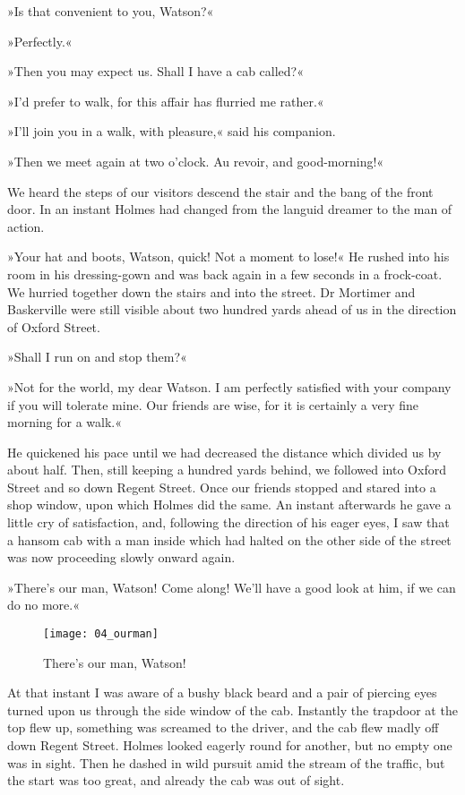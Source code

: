 »Is that convenient to you, Watson?«

»Perfectly.«

»Then you may expect us. Shall I have a cab called?«

»I'd prefer to walk, for this affair has flurried me rather.«

»I'll join you in a walk, with pleasure,« said his companion.

»Then we meet again at two o'clock. Au revoir, and good-morning!«

We heard the steps of our visitors descend the stair and the bang of the front door. In an instant Holmes had changed from the languid dreamer to the man of action.

»Your hat and boots, Watson, quick! Not a moment to lose!« He rushed into his room in his dressing-gown and was back again in a few seconds in a frock-coat. We hurried together down the stairs and into the street. Dr Mortimer and Baskerville were still visible about two hundred yards ahead of us in the direction of Oxford Street.

»Shall I run on and stop them?«

»Not for the world, my dear Watson. I am perfectly satisfied with your company if you will tolerate mine. Our friends are wise, for it is certainly a very fine morning for a walk.«

He quickened his pace until we had decreased the distance which divided us by about half. Then, still keeping a hundred yards behind, we followed into Oxford Street and so down Regent Street. Once our friends stopped and stared into a shop window, upon which Holmes did the same. An instant afterwards he gave a little cry of satisfaction, and, following the direction of his eager eyes, I saw that a hansom cab with a man inside which had halted on the other side of the street was now proceeding slowly onward again.

»There's our man, Watson! Come along! We'll have a good look at him, if we can do no more.«

\begin{figure}[p]
\centering
\texttt{[image: 04\_ourman]}
\caption{There's our man, Watson!}
\end{figure}

At that instant I was aware of a bushy black beard and a pair of piercing eyes turned upon us through the side window of the cab. Instantly the trapdoor at the top flew up, something was screamed to the driver, and the cab flew madly off down Regent Street. Holmes looked eagerly round for another, but no empty one was in sight. Then he dashed in wild pursuit amid the stream of the traffic, but the start was too great, and already the cab was out of sight.

